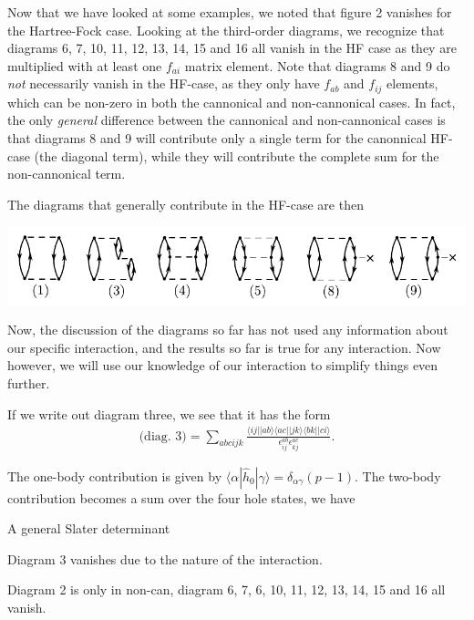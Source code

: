 \documentclass[a4paper, 11pt, notitlepage, english]{article}
\newcommand{\brakket}[2]{\langle #1 || #2 \rangle}
\newcommand{\op}[1]{\hat{#1}}
\newcommand{\braopket}[3]{\langle #1 | {#2} | #3 \rangle}
\newcommand{\eps}{\epsilon}
\begin{document}
Now that we have looked at some examples, we noted that figure 2 vanishes for the Hartree-Fock case. Looking at the third-order diagrams, we recognize that diagrams 6, 7, 10, 11, 12, 13, 14, 15 and 16 all vanish in the HF case as they are multiplied with at least one $f_{ai}$ matrix element. Note that diagrams 8 and 9 do \emph{not} necessarily vanish in the HF-case, as they only have $f_{ab}$ and $f_{ij}$ elements, which can be non-zero in both the cannonical and non-cannonical cases. In fact, the only \emph{general} difference between the cannonical and non-cannonical cases is that diagrams 8 and 9 will contribute only a single term for the canonnical HF-case (the diagonal term), while they will contribute the complete sum for the non-cannonical term.

The diagrams that generally contribute in the HF-case are then

\begin{center}
\includegraphics[width=\textwidth]{project2_5}
\end{center}

Now, the discussion of the diagrams so far has not used any information about our specific interaction, and the results so far is true for any interaction. Now however, we will use our knowledge of our interaction to simplify things even further.

If we write out diagram three, we see that it has the form
\begin{align*}
    \mbox{(diag.\ 3)} = \sum_{abcijk}\frac{\brakket{ij}{ab}\brakket{ac}{jk}\brakket{bk}{ci}}{\eps_{ij}^{ab}\eps_{kj}^{ac}}.
\end{align*}


\clearpage




 The one-body contribution is given by $\braopket{\alpha}{\op{h}_0}{\gamma} = \delta_{\alpha\gamma} (p-1)$. The two-body contribution becomes a sum over the four hole states, we have


A general Slater determinant





Diagram 3 vanishes due to the nature of the interaction.

Diagram 2 is only in non-can, diagram 6, 7, 6, 10, 11, 12, 13, 14, 15 and 16 all vanish.
\end{document}
